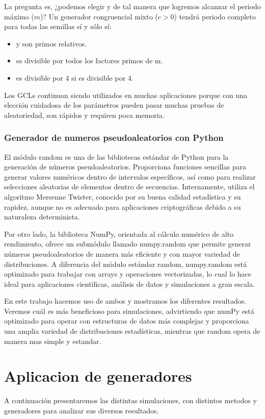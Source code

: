 \documentclass{article}
\begin{document}
La pregunta es, ¿podemos elegir y de tal manera que logremos alcanzar el periodo máximo (\( m \))? Un
generador congruencial mixto ($c>0$) tendrá periodo completo para todas las semillas sí y sólo sí:

\begin{itemize}
    \item y son primos relativos.
    \item es divisible por todos los factores primos de m.
    \item es divisible por 4 si es divisible por 4.
\end{itemize}

Los GCLs continuan siendo utilizados en muchas aplicaciones porque con una elección cuidadosa de los parámetros pueden pasar muchas pruebas de aleatoriedad, son rápidos y requiren poca memoria.
\subsubsection{Generador de numeros pseudoaleatorios con Python}

El módulo random es una de las bibliotecas estándar de Python para la generación de números pseudoaleatorios. Proporciona funciones sencillas para generar valores numéricos dentro de intervalos específicos, así como para realizar selecciones aleatorias de elementos dentro de secuencias. Internamente, utiliza el algoritmo Mersenne Twister, conocido por su buena calidad estadística y su rapidez, aunque no es adecuado para aplicaciones criptográficas debido a su naturaleza determinista.

Por otro lado, la biblioteca NumPy, orientada al cálculo numérico de alto rendimiento, ofrece un submódulo llamado numpy.random que permite generar números pseudoaleatorios de manera más eficiente y con mayor variedad de distribuciones. A diferencia del módulo estándar random, numpy.random está optimizado para trabajar con arrays y operaciones vectorizadas, lo cual lo hace ideal para aplicaciones científicas, análisis de datos y simulaciones a gran escala.

En este trabajo hacemos uso de ambos y mostramos los diferentes resultados. Veremos cuál es más beneficioso para simulaciones, advirtiendo que numPy está optimizado para operar con estructuras de datos más complejas y proporciona una amplia variedad de distribuciones estadísticas, mientras que random opera de manera mas simple y estandar.
      
\section{Aplicacion de generadores}
A continuación presentaremos las distintas simulaciones, con distintos metodos y generadores para analizar sus diversos resultados.
\end{document}
